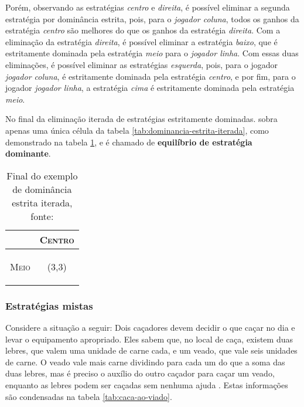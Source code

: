 Porém, observando as estratégias \emph{centro} e \emph{direita}, é possível eliminar a segunda estratégia por dominância estrita, pois, para o \emph{jogador coluna}, todos os ganhos da estratégia \emph{centro} são melhores do que os ganhos da estratégia \emph{direita}. Com a eliminação da estratégia \emph{direita}, é possível eliminar a estratégia \emph{baixo}, que é estritamente dominada pela estratégia \emph{meio} para o \emph{jogador linha}. Com essas duas eliminações, é possível eliminar as estratégias \emph{esquerda}, pois, para o jogador \emph{jogador coluna}, é estritamente dominada pela estratégia \emph{centro}, e por fim, para o jogador \emph{jogador linha}, a estratégia \emph{cima} é estritamente dominada pela estratégia \emph{meio}.

No final da eliminação iterada de estratégias estritamente dominadas. sobra apenas uma única célula da tabela \ref{tab:dominancia-estrita-iterada}, como demonstrado na tabela \ref{tab:final-dominancia-estrita-iterada}, e é chamado de \textbf{equilíbrio de estratégia dominante}.

\begin{table}[ht]
\centering
\begin{tabular}{|c|c|}
\cline{2-2}
\multicolumn{1}{c|}{} & {\scshape Centro} \tabularnewline
\hline
\begin{turn}{90}
{\scshape Meio}
\end{turn} &  {\Large(}{\Large 3,}{\Large 3)}\tabularnewline
\hline
\end{tabular}
\caption{Final do exemplo de dominância estrita iterada, fonte: \cite{spaniel_2011}}
\label{tab:final-dominancia-estrita-iterada}
\end{table}

\subsubsection{Estratégias mistas}

Considere a situação a seguir: Dois caçadores devem decidir o que caçar no dia e levar o equipamento apropriado. Eles sabem que, no local de caça, existem duas lebres, que valem uma unidade de carne cada, e um veado, que vale seis unidades de carne. O veado vale mais carne dividindo para cada um do que a soma das duas lebres, mas é preciso o auxílio do outro caçador para caçar um veado, enquanto as lebres podem ser caçadas sem nenhuma ajuda \cite{spaniel_2011}. Estas informações são condensadas na tabela \ref{tab:caca-ao-viado}.

